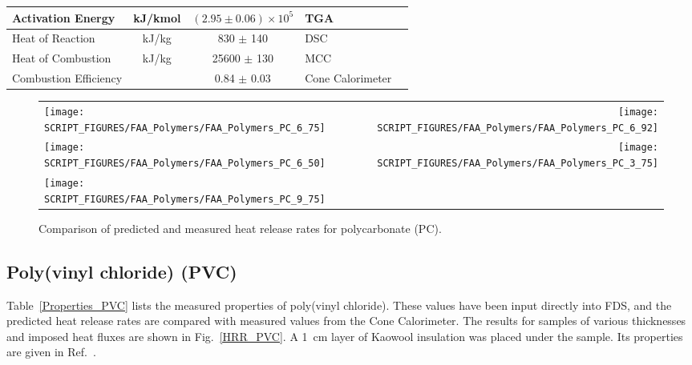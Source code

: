 \begin{table}[h!]
\begin{center}
\begin{tabular}{|l|c|c|l|l|}
Activation Energy           & kJ/kmol       & $(2.95 \pm 0.06) \times 10^{5}$   & TGA                   &  \cite{Stoliarov:CF2010}                  \\ \hline
Heat of Reaction            & kJ/kg         & 830 $\pm$ 140                     & DSC                   &  \cite{Stoliarov:PDS2008}                 \\ \hline
Heat of Combustion          & kJ/kg         & 25600 $\pm$ 130                   & MCC                   &  \cite{Stoliarov:CF2010}                  \\ \hline
Combustion Efficiency       &               & 0.84 $\pm$ 0.03                   & Cone Calorimeter      &  \cite{Stoliarov:CF2010}                  \\ \hline
\end{tabular}
\end{center}
\label{Properties_PC}
\end{table}

\begin{figure}[p]
\begin{tabular*}{\textwidth}{l@{\extracolsep{\fill}}r}
\texttt{[image: SCRIPT\_FIGURES/FAA\_Polymers/FAA\_Polymers\_PC\_6\_75]} &
\texttt{[image: SCRIPT\_FIGURES/FAA\_Polymers/FAA\_Polymers\_PC\_6\_92]} \\
\texttt{[image: SCRIPT\_FIGURES/FAA\_Polymers/FAA\_Polymers\_PC\_6\_50]} &
\texttt{[image: SCRIPT\_FIGURES/FAA\_Polymers/FAA\_Polymers\_PC\_3\_75]} \\
\texttt{[image: SCRIPT\_FIGURES/FAA\_Polymers/FAA\_Polymers\_PC\_9\_75]} &
\end{tabular*}
\caption[Heat release rate of polycarbonate (PC).]{Comparison of predicted and measured heat release rates for polycarbonate (PC).}
\label{HRR_PC}
\end{figure}

\clearpage


\subsection{Poly(vinyl chloride) (PVC)}

Table~\ref{Properties_PVC} lists the measured properties of poly(vinyl chloride). These values have been input directly into FDS, and the predicted heat release rates
are compared with measured values from the Cone
Calorimeter. The results for samples of various thicknesses and imposed heat fluxes are shown in Fig.~\ref{HRR_PVC}.
A 1~cm layer of Kaowool insulation was placed under the sample. Its properties are given in Ref.~\cite{Stoliarov:CF2010}.

